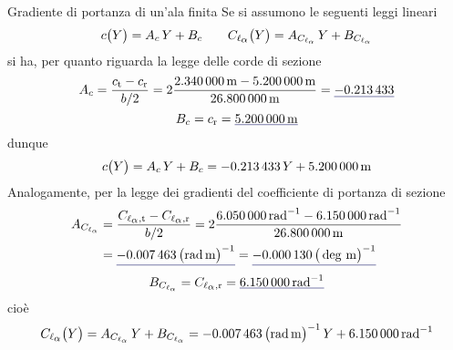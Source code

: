 \documentclass[[12pt,twoside]{book}
\begin{document}
\begin{myExampleX}{Gradiente di portanza di un'ala finita}{}
\medskip
Se si assumono le seguenti leggi lineari
\[
c \big( Y \big) = A_c \, Y + B_c 
\qquad
C_{\ell_\mathlarger{\alpha}} \big( Y \big) = A_{C_{\ell_\alpha}} \, Y + B_{C_{\ell_\alpha}}
\]
si ha, per quanto riguarda la legge delle corde di sezione
\[
A_c
  = \frac{c_\mathrm{t} - c_\mathrm{r}}{b/2}
  = 
    2 \frac{
      \SI[round-precision=2]{\myChordTipWingMT}{\metre} - \SI[round-precision=2]{\myChordRootWingMT}{\metre}
    }{
      \SI[round-precision=2]{\mySpanWingMT}{\metre}
    }
  = \mathunderline{mydarkblue}{ \SI[round-precision=3]{\myCoeffAChordWing}{} }
\]
\[
B_c
  = c_\mathrm{r}
  = \mathunderline{mydarkblue}{ \SI[round-precision=2]{\myCoeffBChordWingMT}{\metre} }
\]
dunque
\[
c \big( Y \big) = A_c \, Y + B_c
  = \SI[round-precision=3]{\myCoeffAChordWing}{} \, Y
    + \SI[round-precision=2]{\myCoeffBChordWingMT}{\metre}
\]
Analogamente, per la legge dei gradienti del coefficiente di portanza di sezione
\[
\begin{split}
A_{C_{\ell_\alpha}}
  & {}= \frac{C_{\ell_\mathlarger{\alpha},\mathrm{t}} - C_{\ell_\mathlarger{\alpha},\mathrm{r}}}{b/2}
  = 
    2 \frac{
      \SI[round-precision=2]{\myCLAlphaTipWingRAD}{\radian^{-1}} 
      - \SI[round-precision=2]{\myCLAlphaRootWingRAD}{\radian^{-1}}
    }{
      \SI[round-precision=2]{\mySpanWingMT}{\metre}
    }
\\
  & {}= 
    \mathunderline{mydarkblue}{ 
      \SI[round-precision=5]{\myCoeffAClalphaWingRADMT}{\big(\radian\,\metre\big)^{-1}} 
    }
  = 
    \mathunderline{mydarkblue}{ 
      \SI[round-precision=7]{\myCoeffAClalphaWingDEGMT}{\big(\deg\,\metre\big)^{-1}} 
    }
\end{split}
\]
\[
B_{C_{\ell_\alpha}}
  = C_{\ell_\mathlarger{\alpha},\mathrm{r}}
  = \mathunderline{mydarkblue}{ \SI[round-precision=3]{\myCoeffBClalphaWingRAD}{\radian^{-1}} }
\]
cioè
\[
C_{\ell_\mathlarger{\alpha}} \big( Y \big) = A_{C_{\ell_\alpha}} \, Y + B_{C_{\ell_\alpha}}
  = \SI[round-precision=5]{\myCoeffAClalphaWingRADMT}{\big(\radian\,\metre\big)^{-1}} \, Y
    + \SI[round-precision=3]{\myCoeffBClalphaWingRAD}{\radian^{-1}}
\]


\end{myExampleX}
\end{document}
